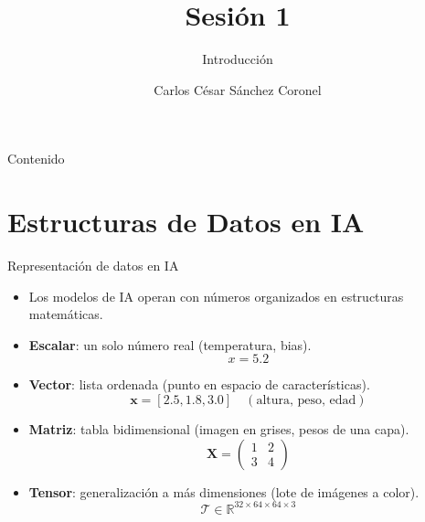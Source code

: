 \documentclass[aspectratio=169, 10pt, xcolor=table]{beamer}
\title[SESI\'ON 1 CÁLCULO]{\textbf{Sesi\'on 1}}
\subtitle{Introducción}
\author[Prof. C. S\'anchez]{Carlos C\'esar S\'anchez Coronel}
\institute{\textbf{CÁLCULO Y ÁLGEBRA LINEAL PARA IA}}
\date{}
\begin{document}
\begin{frame}
    \titlepage
\end{frame}

\begin{frame}{Contenido}
    \tableofcontents
\end{frame}

\section{Estructuras de Datos en IA}

\begin{frame}{Representación de datos en IA}
    \begin{itemize}
        \item Los modelos de IA operan con números organizados en estructuras matemáticas.
        \item \textbf{Escalar}: un solo número real (temperatura, bias).
            \[
            x = 5.2
            \]
        \item \textbf{Vector}: lista ordenada (punto en espacio de características).
            \[
            \mathbf{x} = [2.5, 1.8, 3.0] \quad (\text{altura, peso, edad})
            \]
        \item \textbf{Matriz}: tabla bidimensional (imagen en grises, pesos de una capa).
            \[
            \mathbf{X} = \begin{pmatrix}
                1 & 2 \\
                3 & 4
            \end{pmatrix}
            \]
        \item \textbf{Tensor}: generalización a más dimensiones (lote de imágenes a color).
            \[
            \mathcal{T} \in \mathbb{R}^{32 \times 64 \times 64 \times 3}
            \]
    \end{itemize}
\end{frame}
\end{document}
